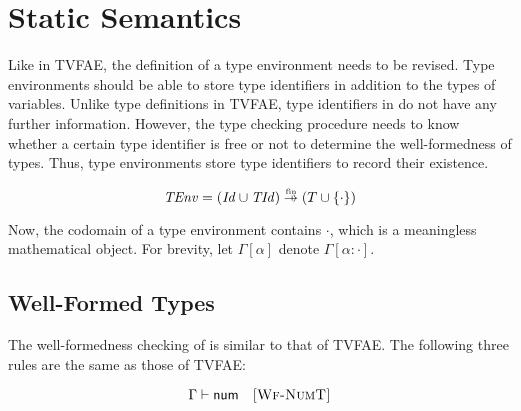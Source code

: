 


\section{Static Semantics}

Like in \textsf{TVFAE}, the definition of a type environment needs to be
revised. Type environments should be able to store type identifiers in
addition to the types of variables. Unlike type definitions in \textsf{TVFAE},
type identifiers in \lang do not have any further information. However, the type
checking procedure needs to know whether a certain type identifier is free or
not to determine the well-formedness of types. Thus, type environments store
type identifiers to record their existence.

\[
  \embox{TEnv}=(\embox{Id}\cup\embox{TId})\finto(T\cup\{\cdot\})
\]

Now, the codomain of a type environment contains $\cdot$, which is a
meaningless mathematical object. For brevity, let $\Gamma[\alpha]$ denote
$\Gamma[\alpha:\cdot]$.

\subsection{Well-Formed Types}

The well-formedness checking of \lang is similar to that of \textsf{TVFAE}.
The following three rules are the same as those of \textsf{TVFAE}:


\vspace{-1em}

\[
  \Gamma\vdash\textsf{num}
  \quad\textsc{[Wf-NumT]}
\]


